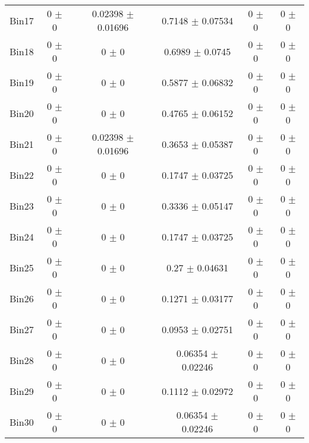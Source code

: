 \begin{tabular}{@{\extracolsep{4pt}}lccccc@{}}
     Bin17 & 0 $\pm$ 0 & 0.02398 $\pm$ 0.01696 & 0.7148 $\pm$ 0.07534 & 0 $\pm$ 0 & 0 $\pm$ 0 \\ 
     Bin18 & 0 $\pm$ 0 & 0 $\pm$ 0 & 0.6989 $\pm$ 0.0745 & 0 $\pm$ 0 & 0 $\pm$ 0 \\ 
     Bin19 & 0 $\pm$ 0 & 0 $\pm$ 0 & 0.5877 $\pm$ 0.06832 & 0 $\pm$ 0 & 0 $\pm$ 0 \\ 
     Bin20 & 0 $\pm$ 0 & 0 $\pm$ 0 & 0.4765 $\pm$ 0.06152 & 0 $\pm$ 0 & 0 $\pm$ 0 \\ 
     Bin21 & 0 $\pm$ 0 & 0.02398 $\pm$ 0.01696 & 0.3653 $\pm$ 0.05387 & 0 $\pm$ 0 & 0 $\pm$ 0 \\ 
     Bin22 & 0 $\pm$ 0 & 0 $\pm$ 0 & 0.1747 $\pm$ 0.03725 & 0 $\pm$ 0 & 0 $\pm$ 0 \\ 
     Bin23 & 0 $\pm$ 0 & 0 $\pm$ 0 & 0.3336 $\pm$ 0.05147 & 0 $\pm$ 0 & 0 $\pm$ 0 \\ 
     Bin24 & 0 $\pm$ 0 & 0 $\pm$ 0 & 0.1747 $\pm$ 0.03725 & 0 $\pm$ 0 & 0 $\pm$ 0 \\ 
     Bin25 & 0 $\pm$ 0 & 0 $\pm$ 0 & 0.27 $\pm$ 0.04631 & 0 $\pm$ 0 & 0 $\pm$ 0 \\ 
     Bin26 & 0 $\pm$ 0 & 0 $\pm$ 0 & 0.1271 $\pm$ 0.03177 & 0 $\pm$ 0 & 0 $\pm$ 0 \\ 
     Bin27 & 0 $\pm$ 0 & 0 $\pm$ 0 & 0.0953 $\pm$ 0.02751 & 0 $\pm$ 0 & 0 $\pm$ 0 \\ 
     Bin28 & 0 $\pm$ 0 & 0 $\pm$ 0 & 0.06354 $\pm$ 0.02246 & 0 $\pm$ 0 & 0 $\pm$ 0 \\ 
     Bin29 & 0 $\pm$ 0 & 0 $\pm$ 0 & 0.1112 $\pm$ 0.02972 & 0 $\pm$ 0 & 0 $\pm$ 0 \\ 
     Bin30 & 0 $\pm$ 0 & 0 $\pm$ 0 & 0.06354 $\pm$ 0.02246 & 0 $\pm$ 0 & 0 $\pm$ 0 \\ 
\hline\hline
  \end{tabular}
